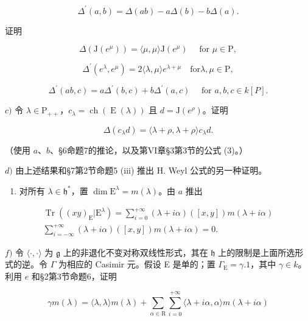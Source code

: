 \[
\Delta^ {\prime} (a, b) = \Delta (a b) - a \Delta (b) - b \Delta (a).
\]

证明

\[
\Delta (\mathrm{J} (e ^ {\mu})) = \langle \mu , \mu \rangle \mathrm{J} (e ^ {\mu}) \quad \text { for } \mu \in \mathrm{P},
\]

\[
\Delta^ {\prime} (e ^ {\lambda}, e ^ {\mu}) = 2 \langle \lambda , \mu \rangle e ^ {\lambda + \mu} \quad \mathrm{for} \lambda , \mu \in \mathrm{P},
\]

\[
\Delta^ {\prime} (a b, c) = a \Delta^ {\prime} (b, c) + b \Delta^ {\prime} (a, c) \quad \text { for } a, b, c \in k [ P ].
\]

\(c)\) 令 \(\lambda \in \mathrm{P}_{++}\)，\(c_{\lambda} = \operatorname{ch}(\operatorname{E}(\lambda))\) 且 \(d = \mathrm{J}(e^{\rho})\)。证明

\[
\Delta (c _ {\lambda} d) = \langle \lambda + \rho , \lambda + \rho \rangle c _ {\lambda} d.
\]

（使用 \(a\)、\(b\)、§6命题7的推论，以及第VI章§3第3节的公式 (3)。）

\(d)\) 由上述结果和§7第2节命题5 (iii) 推出 H. Weyl 公式的另一种证明。

\begin{enumerate}
\def\labelenumi{\alph{enumi})}
\setcounter{enumi}{4}
\tightlist
\item
  对所有 \(\lambda \in \mathfrak{h}^*\)，置 \(\dim \mathrm{E}^{\lambda} = m(\lambda)\)。由 \(a\) 推出
\end{enumerate}

\[
\begin{array}{c} \operatorname{Tr} ((x y) _ {\mathrm{E}} | \mathrm{E} ^ {\lambda}) = \sum_ {i = 0} ^ {+ \infty} (\lambda + i \alpha) ([ x, y ]) m (\lambda + i \alpha) \\ \sum_ {i = - \infty} ^ {+ \infty} (\lambda + i \alpha) ([ x, y ]) m (\lambda + i \alpha) = 0. \end{array}
\]

\(f)\) 令 \(\langle\cdot,\cdot\rangle\) 为 \(\mathfrak{g}\) 上的非退化不变对称双线性形式，其在 \(\mathfrak{h}\) 上的限制是上面所选形式的逆。令 \(\Gamma\) 为相应的 Casimir 元。假设 E 是单的；置 \(\Gamma_{\mathrm{E}}=\gamma.1\)，其中 \(\gamma\in k\)。利用 \(e\) 和§2第3节命题6，证明

\[
\gamma m (\lambda) = \langle \lambda , \lambda \rangle m (\lambda) + \sum_ {\alpha \in \mathrm{R}} \sum_ {i = 0} ^ {+ \infty} \langle \lambda + i \alpha , \alpha \rangle m (\lambda + i \alpha)
\]

